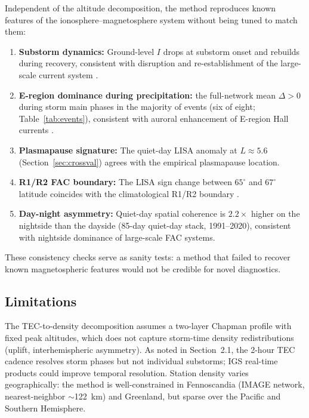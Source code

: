\documentclass[11pt,letterpaper]{article}
\begin{document}
Independent of the altitude decomposition, the method reproduces known features
of the ionosphere--magnetosphere system without being tuned to match them:
\begin{enumerate}
\item \textbf{Substorm dynamics:} Ground-level $I$ drops at substorm onset and
  rebuilds during recovery, consistent with disruption and re-establishment of the
  large-scale current system \citep{kamide1982estimation}.
\item \textbf{E-region dominance during precipitation:} the full-network mean
  $\Delta > 0$ during storm main phases in the majority of events (six of eight;
  Table~\ref{tab:events}), consistent with auroral enhancement of E-region Hall
  currents \citep{hardy1987auroral}.
\item \textbf{Plasmapause signature:} The quiet-day LISA anomaly at $L \approx 5.6$
  (Section~\ref{sec:crossval}) agrees with the \citet{carpenter1992plasmapause}
  empirical plasmapause location.
\item \textbf{R1/R2 FAC boundary:} The LISA sign change between
  $65^{\circ}$ and $67^{\circ}$ latitude coincides with the climatological R1/R2
  boundary \citep{iijima1976fac}.
\item \textbf{Day-night asymmetry:} Quiet-day spatial coherence is $2.2\times$
  higher on the nightside than the dayside (85-day quiet-day stack, 1991--2020),
  consistent with nightside dominance of large-scale FAC systems.
\end{enumerate}
These consistency checks serve as sanity tests: a method that failed to recover
known magnetospheric features would not be credible for novel diagnostics.

\subsection{Limitations}

The TEC-to-density decomposition assumes a two-layer Chapman profile with fixed
peak altitudes, which does not capture storm-time density redistributions
(uplift, interhemispheric asymmetry). As noted in Section~2.1, the 2-hour TEC
cadence resolves storm phases but not individual substorms; IGS real-time products
\citep{hernandez2009igs} could improve temporal resolution.
Station density varies geographically: the method is well-constrained in
Fennoscandia (IMAGE network, nearest-neighbor $\sim$122~km) and Greenland, but
sparse over the Pacific and Southern Hemisphere.
\end{document}
